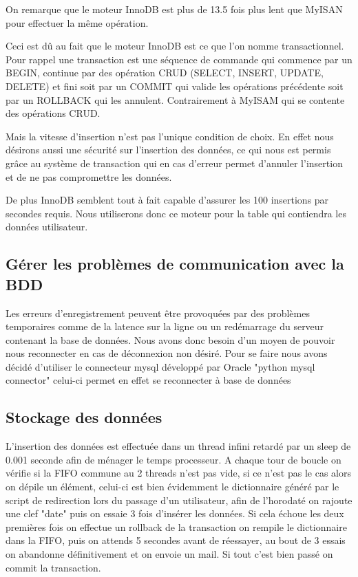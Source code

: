 On remarque que le moteur InnoDB est plus de 13.5 fois plus lent que MyISAN pour effectuer la même opération.

Ceci est dû au fait que le moteur InnoDB est ce que l'on nomme transactionnel. Pour rappel une transaction est une séquence de commande qui commence par un BEGIN, continue par des opération CRUD (SELECT, INSERT, UPDATE, DELETE) et fini soit par un COMMIT qui valide les opérations précédente soit par un ROLLBACK qui les annulent. Contrairement à MyISAM qui se contente des opérations CRUD.

Mais la vitesse d'insertion n'est pas l'unique condition de choix. En effet nous désirons aussi une sécurité sur l'insertion des données, ce qui nous est permis grâce au système de transaction qui en cas d'erreur permet d'annuler l'insertion et de ne pas compromettre les données.

De plus InnoDB semblent tout à fait capable d'assurer les 100 insertions par secondes requis. Nous utiliserons donc ce moteur pour la table qui contiendra les données utilisateur.

\subsection*{Gérer les problèmes de communication avec la BDD}

Les erreurs d'enregistrement peuvent être provoquées par des problèmes temporaires comme de la latence sur la ligne ou un redémarrage du serveur contenant la base de données.
Nous avons donc besoin d'un moyen de pouvoir nous reconnecter en cas de déconnexion non désiré. Pour se faire nous avons décidé d'utiliser le connecteur mysql développé par Oracle "python mysql connector" celui-ci permet en effet se reconnecter à base de données

\subsection*{Stockage des données}

L'insertion des données est effectuée dans un thread infini retardé par un sleep de 0.001 seconde afin de ménager le temps processeur. A chaque tour de boucle on vérifie si la FIFO commune au 2 threads n'est pas vide, si ce n'est pas le cas alors on dépile un élément, celui-ci est bien évidemment le dictionnaire généré par le script de redirection lors du passage d'un utilisateur, afin de l'horodaté on rajoute une clef "date"  puis on essaie 3 fois d'insérer les données. Si cela échoue les deux premières fois on effectue un rollback de la transaction on rempile le dictionnaire dans la FIFO, puis on attends 5 secondes avant de réessayer, au bout de 3 essais on abandonne définitivement et on envoie un mail. Si tout c'est bien passé on commit la transaction.

